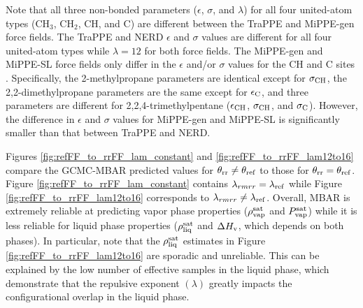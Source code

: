 \documentclass[journal=jced,manuscript=article]{achemso}
\begin{document}
Note that all three non-bonded parameters ($\epsilon$, $\sigma$, and $\lambda$) for all four united-atom types (CH$_3$, CH$_2$, CH, and C) are different between the TraPPE and MiPPE-gen force fields. The TraPPE and NERD $\epsilon$ and $\sigma$ values are different for all four united-atom types while $\lambda = 12$ for both force fields. The MiPPE-gen and MiPPE-SL force fields only differ in the $\epsilon$ and/or $\sigma$ values for the CH and C sites . Specifically, the 2-methylpropane parameters are identical except for $\sigma_{\rm CH}$, the 2,2-dimethylpropane parameters are the same except for $\epsilon_{\rm C}$, and three parameters are different for 2,2,4-trimethylpentane ($\epsilon_{\rm CH}$, $\sigma_{\rm CH}$, and $\sigma_{\rm C}$). However, the difference in $\epsilon$ and $\sigma$ values for MiPPE-gen and MiPPE-SL is significantly smaller than that between TraPPE and NERD.

Figures \ref{fig:refFF_to_rrFF_lam_constant} and \ref{fig:refFF_to_rrFF_lam12to16} compare the GCMC-MBAR predicted values for $\theta_{\rm rr} \neq \theta_{\rm ref}$ to those for $\theta_{\rm rr} = \theta_{\rm ref}$. Figure \ref{fig:refFF_to_rrFF_lam_constant} contains $\lambda_{rm rr} = \lambda_{\rm ref}$ while Figure \ref{fig:refFF_to_rrFF_lam12to16} corresponds to $\lambda_{rm rr} \neq \lambda_{\rm ref}$. Overall, MBAR is extremely reliable at predicting vapor phase properties ($\rho_{\rm vap}^{\rm sat}$ and $P_{\rm vap}^{\rm sat}$) while it is less reliable for liquid phase properties ($\rho_{\rm liq}^{\rm sat}$ and $\Delta H_{\rm v}$, which depends on both phases). In particular, note that the $\rho_{\rm liq}^{\rm sat}$ estimates in Figure \ref{fig:refFF_to_rrFF_lam12to16} are sporadic and unreliable. This can be explained by the low number of effective samples in the liquid phase, which demonstrate that the repulsive exponent $(\lambda)$ greatly impacts the configurational overlap in the liquid phase.


\end{document}
